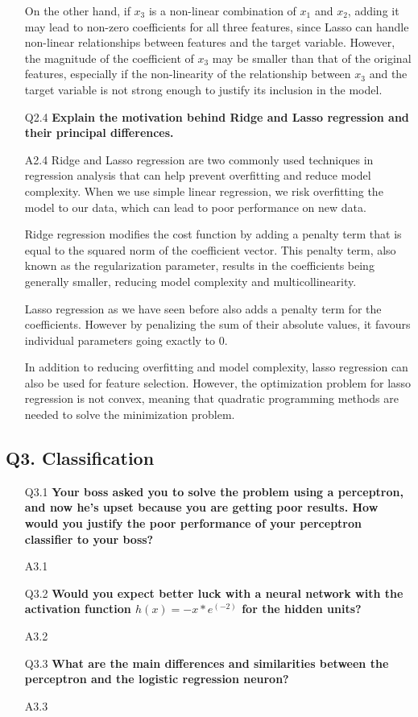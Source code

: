 \documentclass[tikz,14pt,fleqn]{article}
\begin{document}
\begin{itemize}
On the other hand, if $x_3$ is a non-linear combination of $x_1$ and $x_2$, adding it may lead to non-zero coefficients for all three features, since Lasso can handle non-linear relationships between features and the target variable. However, the magnitude of the coefficient of $x_3$ may be smaller than that of the original features, especially if the non-linearity of the relationship between $x_3$ and the target variable is not strong enough to justify its inclusion in the model.

\item[Q2.4] \textbf{Explain the motivation behind Ridge and Lasso regression and their principal differences.}
\item[A2.4] Ridge and Lasso regression are two commonly used techniques in regression analysis that can help prevent overfitting and reduce model complexity. When we use simple linear regression, we risk overfitting the model to our data, which can lead to poor performance on new data.

Ridge regression modifies the cost function by adding a penalty term that is equal to the squared norm of the coefficient vector. This penalty term, also known as the regularization parameter, results in the coefficients being generally smaller, reducing model complexity and multicollinearity.

Lasso regression as we have seen before also adds a penalty term for the coefficients. However by penalizing the sum of their absolute values, it favours individual parameters going exactly to 0.

In addition to reducing overfitting and model complexity, lasso regression can also be used for feature selection. However, the optimization problem for lasso regression is not convex, meaning that quadratic programming methods are needed to solve the minimization problem.
\end{itemize}

\subsection{Q3. Classification}
\begin{itemize}
\item[Q3.1] \textbf{Your boss asked you to solve the problem using a perceptron, and now he's upset because you are getting poor results. How would you justify the poor performance of your perceptron classifier to your boss?}
\item[A3.1] ~\\

\item[Q3.2] \textbf{Would you expect better luck with a neural network with the activation function $h(x) = - x * e^(-2)$ for the hidden units?}
\item[A3.2] ~\\

\item[Q3.3] \textbf{What are the main differences and similarities between the perceptron and the logistic regression neuron?}
\item[A3.3] ~\\

\end{itemize}
\end{document}
